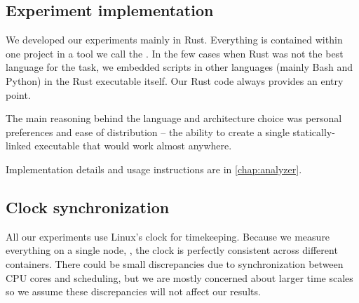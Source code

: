 \subsection{Experiment implementation}

We developed our experiments mainly in Rust. Everything is contained within one project in a tool we call the . In the few cases when Rust was not the best language for the task, we embedded scripts in other languages (mainly Bash and Python) in the Rust executable itself. Our Rust code always provides an entry point.

The main reasoning behind the language and architecture choice was personal preferences and ease of distribution -- the ability to create a single statically-linked executable that would work almost anywhere.

Implementation details and usage instructions are in \cref{chap:analyzer}.

\subsection{Clock synchronization}

All our experiments use Linux's  clock for timekeeping. Because we measure everything on a single node, , the clock is perfectly consistent across different containers. There could be small discrepancies due to synchronization between CPU cores and scheduling, but we are mostly concerned about larger time scales so we assume these discrepancies will not affect our results.

